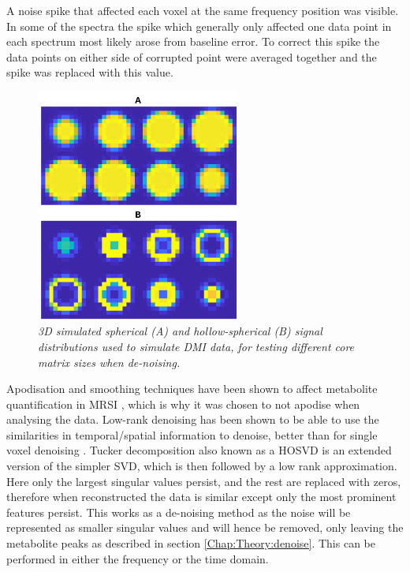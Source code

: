 A noise spike that affected each voxel at the same frequency position was visible. In some of the spectra the spike which generally only affected one data point in each spectrum most likely arose from baseline error. To correct this spike the data points on either side of corrupted point were averaged together and the spike was replaced with this value. 

\begin{figure}
    \centering
    \includegraphics[width = 0.6\textwidth]{Figures/Glucose/Template.png}
    \caption{\textit{3D simulated spherical (A) and hollow-spherical (B) signal distributions used to simulate \ac{DMI} data, for testing different core matrix sizes when de-noising.}}
    \label{fig:Glu:Temp}
\end{figure}

Apodisation and smoothing techniques have been shown to affect metabolite quantification in \ac{MRSI} \cite{Goryawala2020EffectsFitting}, which is why it was chosen to not apodise when analysing the data. Low-rank denoising has been shown to be able to use the similarities in temporal/spatial information to denoise, better than for single voxel denoising \cite{Brender2019DynamicHyperpolarization, Goryawala2020EffectsFitting}. Tucker decomposition also known as a \ac{HOSVD} is an extended version of the simpler \ac{SVD}, which is then followed by a low rank approximation. Here only the largest singular values persist, and the rest are replaced with zeros, therefore when reconstructed the data is similar except only the most prominent features persist. This works as a de-noising method as the noise will be represented as smaller singular values and will hence be removed, only leaving the metabolite peaks as described in section \ref{Chap:Theory:denoise}. This can be performed in either the frequency or the time domain. 

